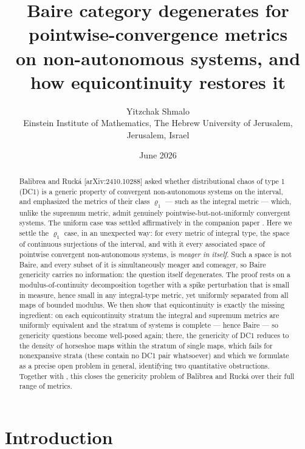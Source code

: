 ﻿\documentclass[11pt]{article}
\title{Baire category degenerates for pointwise-convergence metrics\\
on non-autonomous systems, and how equicontinuity restores it}
\author{Yitzchak Shmalo\\
\small Einstein Institute of Mathematics, The Hebrew University of Jerusalem, Jerusalem, Israel\\
\small }
\date{June 2026}
\begin{document}
\maketitle

\begin{abstract}
Balibrea and Ruck\'a [arXiv:2410.10288] asked whether distributional chaos of type 1
(DC1) is a generic property of convergent non-autonomous systems on the interval,
and emphasized the metrics of their class $\varrho_1$ --- such as the integral
metric --- which, unlike the supremum metric, admit genuinely
pointwise-but-not-uniformly convergent systems.  The uniform case was settled
affirmatively in the companion paper \cite{companion}.  Here we settle the
$\varrho_1$ case, in an unexpected way: for every metric of integral type, the space
of continuous surjections of the interval, and with it every associated space of
pointwise convergent non-autonomous systems, is \emph{meager in itself}.  Such a
space is not Baire, and every subset of it is simultaneously meager and comeager,
so Baire genericity carries no information: the question itself degenerates.  The
proof rests on a modulus-of-continuity decomposition together with a spike
perturbation that is small in measure, hence small in any integral-type metric, yet
uniformly separated from all maps of bounded modulus.  We then show that
equicontinuity is exactly the missing ingredient: on each equicontinuity stratum
the integral and supremum metrics are uniformly equivalent and the stratum of
systems is complete --- hence Baire --- so genericity questions become
well-posed again; there, the genericity of DC1 reduces to the density of
horseshoe maps within the stratum of single maps, which fails for nonexpansive
strata (these contain no DC1 pair whatsoever) and which we formulate as a
precise open problem in general, identifying two quantitative obstructions.
Together with \cite{companion}, this closes the genericity problem of Balibrea and
Ruck\'a over their full range of metrics.
\end{abstract}

\section{Introduction}\label{sec:intro}
\end{document}
